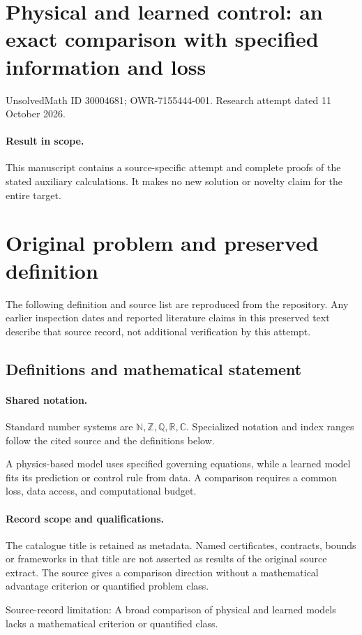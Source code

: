\documentclass[11pt]{article}
\begin{document}
\section*{Physical and learned control: an exact comparison with specified information and loss}
\noindent UnsolvedMath ID 30004681; OWR-7155444-001. Research attempt dated 11 October 2026.
\paragraph{Result in scope.}This manuscript contains a source-specific attempt and complete proofs of the stated auxiliary calculations. It makes no new solution or novelty claim for the entire target.
\section{Original problem and preserved definition}
The following definition and source list are reproduced from the repository. Any earlier inspection dates and reported literature claims in this preserved text describe that source record, not additional verification by this attempt.
\subsection{Definitions and mathematical statement}

\paragraph{Shared notation.}Standard number systems are $\mathbb N,\mathbb Z,\mathbb Q,\mathbb R,\mathbb C$. Specialized notation and index ranges follow the cited source and the definitions below.


A physics-based model uses specified governing equations, while a learned model fits its prediction or control rule from data. A comparison requires a common loss, data access, and computational budget.
\paragraph{Record scope and qualifications.}
The catalogue title is retained as metadata. Named certificates, contracts, bounds or frameworks in that title are not asserted as results of the original source extract.
The source gives a comparison direction without a mathematical advantage criterion or quantified problem class.

Source-record limitation: A broad comparison of physical and learned models lacks a mathematical criterion or quantified class.
\end{document}
